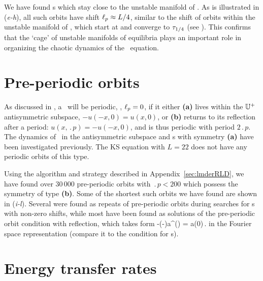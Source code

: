

We have found \rpo s which stay
close to the unstable manifold of .
As is illustrated in (\textit{e-h}), all such orbits have
shift $\ell_p \approx L/4$, similar to the shift of orbits within
the unstable manifold of , which start at  and
converge to $\tau_{1/4}$ (see ). This
confirms that the `cage' of unstable manifolds of equilibria plays
an important role in organizing the chaotic dynamics of the \KS\
equation.


\section{Pre-periodic orbits} \label{ssec:po}

As discussed in , a \rpo\ will be periodic, \ie,
$\ell_p = 0$, if it either {\bf (a)} lives within the $\mathbb{U}^+$ antisymmetric
subspace, $-u(-x,0) = u(x,0)$, or {\bf (b)}
returns to its reflection
after a period: $u(x,\period{p})=-u(-x,0)$,
and is thus periodic
with period $2\period{p}$.
The dynamics of
\KSe\ in the antisymmetric subspace and \po s with symmetry {\bf (a)} have
been investigated
previously. The KS equation
with $L = 22$ does not have any periodic orbits of this type.

Using the algorithm and strategy described in Appendix~\ref{sec:lmderRLD},
we have found over 30\,000 pre-periodic orbits with $\period{p} < 200$
which possess the symmetry of type {\bf (b)}. Some of the shortest such
orbits we have found are shown in \reffig{f:ks22rpos}(\textit{i-l}).
Several were found as
repeats of pre-periodic orbits during searches
for \rpo s with non-zero shifts,
while most have been
found as solutions of the pre-periodic orbit
condition  with reflection,
which takes form
\beq
 -(-\shift)a^\ast() = a(0)\,.
\label{KSposFour}
\eeq
in the Fourier space representation
(compare it to the condition  for \rpo s).


\section{Energy transfer rates}
\label{sec:energyL22}


